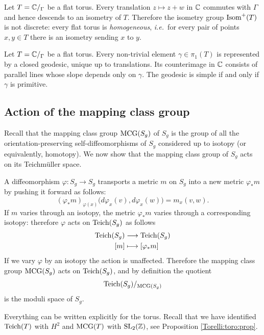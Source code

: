 \begin{oss} \label{torus:isometries:oss}
Let $T=\mathbb{C}/_\Gamma$ be a flat torus. Every translation $z \mapsto z +w$ in $\mathbb{C}$ commutes with $\Gamma$ and hence descends to an isometry of $T$. Therefore the isometry group ${\rm Isom}^+(T)$ is not discrete: every flat torus is \emph{homogeneous}, \emph{i.e.}~for every pair of points $x,y \in T$ there is an isometry sending $x$ to $y$. 
\end{oss}

\begin{oss}
Let $T=\mathbb{C}/_\Gamma$ be a flat torus. Every non-trivial element $\gamma\in\pi_1(T)$ is represented by a closed geodesic, unique up to translations. Its counterimage in $\mathbb{C}$ consists of parallel lines whose slope depends only on $\gamma$.  The geodesic is simple if and only if $\gamma$ is primitive. 
\end{oss}

\subsection{Action of the mapping class group}
Recall that the mapping class group ${\rm MCG}(S_g)$ of $S_g$ is the group of all the orientation-preserving self-diffeomorphisms of $S_g$ considered up to isotopy (or equivalently, homotopy). We now show that the mapping class group of $S_g$ acts on its Teichm\"uller space.

A diffeomorphism $\varphi\colon S_g \to S_g$ transports a metric $m$ on $S_g$ into a new metric $\varphi_*m$ by pushing it forward as follows:
$$(\varphi_*m)_{\varphi(x)}\big(d\varphi_x(v), d\varphi_x(w)\big) = m_x(v,w).$$
If $m$ varies through an isotopy, the metric $\varphi_*m$ varies through a corresponding isotopy: therefore $\varphi$ acts on ${\rm Teich}(S_g)$ as follows
\begin{align*}
{\rm Teich}(S_g) & \longrightarrow {\rm Teich}(S_g) \\
[m] & \longmapsto [\varphi_*m]
\end{align*} 
If we vary $\varphi$ by an isotopy the action is unaffected. 
Therefore the mapping class group ${\rm MCG}(S_g)$ acts on ${\rm Teich}(S_g)$, and by definition the quotient
$${\rm Teich}(S_g)/_{{\rm MCG}(S_g)}$$
is the moduli space of $S_g$. 

Everything can be written explicitly for the torus. Recall that we have identified ${\rm Teich}(T)$ with $H^2$ and ${\rm MCG}(T)$ with ${\rm SL}_2(\mathbb{Z})$, see Proposition \ref{Torelli:toro:prop}.

